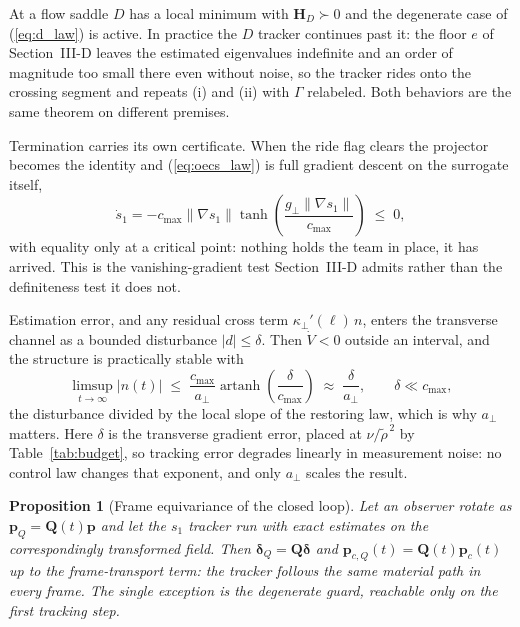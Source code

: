 \documentclass[lettersize,journal]{IEEEtran}
\newtheorem{proposition}{Proposition}
\begin{document}
At a flow saddle $D$ has a local minimum with $\mathbf{H}_D \succ 0$ and
the degenerate case of (\ref{eq:d_law}) is active. In practice the $D$
tracker continues past it: the floor $e$ of Section~\mbox{III-D} leaves
the estimated eigenvalues indefinite and an order of magnitude too small
there even without noise, so the tracker rides onto the crossing segment
and repeats (i) and (ii) with $\Gamma$ relabeled. Both behaviors are the
same theorem on different premises.

Termination carries its own certificate. When the ride flag clears the
projector becomes the identity and (\ref{eq:oecs_law}) is full gradient
descent on the surrogate itself,
\begin{equation}
    \dot{s}_1 = -c_{\max}\lVert\nabla s_1\rVert
    \tanh\!\left(\frac{g_\perp\lVert\nabla s_1\rVert}{c_{\max}}\right)
    \;\leq\; 0,
    \label{eq:s1_lyapunov}
\end{equation}
with equality only at a critical point: nothing holds the team in place,
it has arrived. This is the vanishing-gradient test
Section~\mbox{III-D} admits rather than the definiteness test it does
not.

Estimation error, and any residual cross term $\kappa_\perp'(\ell)\,n$,
enters the transverse channel as a bounded disturbance $|d| \leq
\delta$. Then $\dot{V} < 0$ outside an interval, and the structure is
practically stable with
\begin{equation}
    \limsup_{t\to\infty}|n(t)| \;\leq\;
    \frac{c_{\max}}{a_\perp}
    \operatorname{artanh}\!\left(\frac{\delta}{c_{\max}}\right)
    \;\approx\; \frac{\delta}{a_\perp},
    \qquad \delta \ll c_{\max},
    \label{eq:iss_bound}
\end{equation}
the disturbance divided by the local slope of the restoring law, which
is why $a_\perp$ matters. Here $\delta$ is the transverse gradient
error, placed at $\nu/\tilde{\rho}^{\,2}$ by Table~\ref{tab:budget}, so
tracking error degrades linearly in measurement noise: no control law
changes that exponent, and only $a_\perp$ scales the result.

\begin{proposition}[Frame equivariance of the closed loop]
\label{prop:equivariance}
Let an observer rotate as $\mathbf{p}_Q = \mathbf{Q}(t)\mathbf{p}$ and
let the $s_1$ tracker run with exact estimates on the correspondingly
transformed field. Then $\boldsymbol{\delta}_Q =
\mathbf{Q}\boldsymbol{\delta}$ and $\mathbf{p}_{c,Q}(t) =
\mathbf{Q}(t)\mathbf{p}_c(t)$ up to the frame-transport term: the
tracker follows the same material path in every frame. The single
exception is the degenerate guard, reachable only on the first tracking
step.
\end{proposition}
\end{document}
